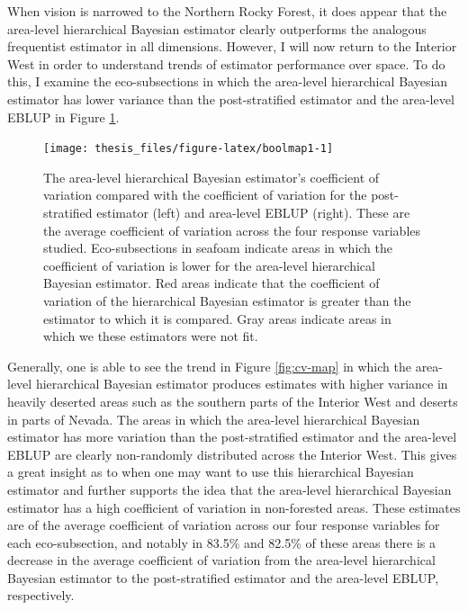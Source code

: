\documentclass[12pt,twoside]{reedthesis}
\begin{document}
When vision is narrowed to the Northern Rocky Forest, it does appear that the area-level hierarchical Bayesian estimator clearly outperforms the analogous frequentist estimator in all dimensions. However, I will now return to the Interior West in order to understand trends of estimator performance over space. To do this, I examine the eco-subsections in which the area-level hierarchical Bayesian estimator has lower variance than the post-stratified estimator and the area-level EBLUP in Figure \ref{fig:boolmap1}.
\clearpage
\begin{figure}

{\centering \texttt{[image: thesis\_files/figure-latex/boolmap1-1]} 

}

\caption[Area-level coefficient of variation comparison across the Interior West]{The area-level hierarchical Bayesian estimator's coefficient of variation compared with the coefficient of variation for the post-stratified estimator (left) and area-level EBLUP (right). These are the average coefficient of variation across the four response variables studied. Eco-subsections in seafoam indicate areas in which the coefficient of variation is lower for the area-level hierarchical Bayesian estimator. Red areas indicate that the coefficient of variation of the hierarchical Bayesian estimator is greater than the estimator to which it is compared. Gray areas indicate areas in which we these estimators were not fit.}\label{fig:boolmap1}
\end{figure}
Generally, one is able to see the trend in Figure \ref{fig:cv-map} in which the area-level hierarchical Bayesian estimator produces estimates with higher variance in heavily deserted areas such as the southern parts of the Interior West and deserts in parts of Nevada. The areas in which the area-level hierarchical Bayesian estimator has more variation than the post-stratified estimator and the area-level EBLUP are clearly non-randomly distributed across the Interior West. This gives a great insight as to when one may want to use this hierarchical Bayesian estimator and further supports the idea that the area-level hierarchical Bayesian estimator has a high coefficient of variation in non-forested areas. These estimates are of the average coefficient of variation across our four response variables for each eco-subsection, and notably in 83.5\% and 82.5\% of these areas there is a decrease in the average coefficient of variation from the area-level hierarchical Bayesian estimator to the post-stratified estimator and the area-level EBLUP, respectively.
\end{document}

